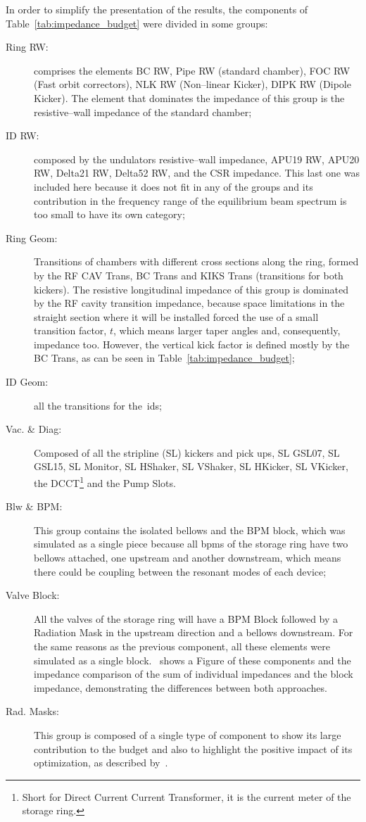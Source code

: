     In order to simplify the presentation of the results, the components of Table~\ref{tab:impedance_budget} were divided in some groups:
    \begin{description}
        \item[Ring RW:] comprises the elements BC RW, Pipe RW (standard chamber), FOC RW (Fast orbit correctors), NLK RW (Non--linear Kicker), DIPK RW (Dipole Kicker). The element that dominates the impedance of this group is the resistive--wall impedance of the standard chamber;
        \item[ID RW:] composed by the undulators resistive--wall impedance, APU19 RW, APU20 RW, Delta21 RW, Delta52 RW, and the CSR impedance. This last one was included here because it does not fit in any of the groups and its contribution in the frequency range of the equilibrium beam spectrum is too small to have its own category;
        \item[Ring Geom:] Transitions of chambers with different cross sections along the ring, formed by the RF CAV Trans, BC Trans and KIKS Trans (transitions for both kickers). The resistive longitudinal impedance of this group is dominated by the RF cavity transition impedance, because space limitations in the straight section where it will be installed forced the use of a small transition factor, $t$, which means larger taper angles and, consequently, impedance too. However, the vertical kick factor is defined mostly by the BC Trans, as can be seen in Table~\ref{tab:impedance_budget};
        \item[ID Geom:] all the transitions for the~\glspl{id};
        \item[Vac. \& Diag:] Composed of all the stripline (SL) kickers and pick ups, SL GSL07, SL GSL15, SL Monitor, SL HShaker, SL VShaker, SL HKicker, SL VKicker, the DCCT\footnote{Short for Direct Current Current Transformer, it is the current meter of the storage ring.} and the Pump Slots.
        \item[Blw \& BPM:] This group contains the isolated bellows and the BPM block,
        which was simulated as a single piece because all \glspl{bpm} of the storage ring have two bellows attached, one upstream and another downstream, which means there could be coupling between the resonant modes of each device;
        \item[Valve Block:] All the valves of the storage ring will have a BPM Block followed by a Radiation Mask in the upstream direction and a bellows downstream. For the same reasons as the previous component, all these elements were simulated as a single block.~ shows a Figure of these components and the impedance comparison of the sum of individual impedances and the block impedance, demonstrating the differences between both approaches.
        \item[Rad. Masks:] This group is composed of a single type of component to show its large contribution to the budget and also to highlight the positive impact of its optimization, as described by~.
    \end{description}

